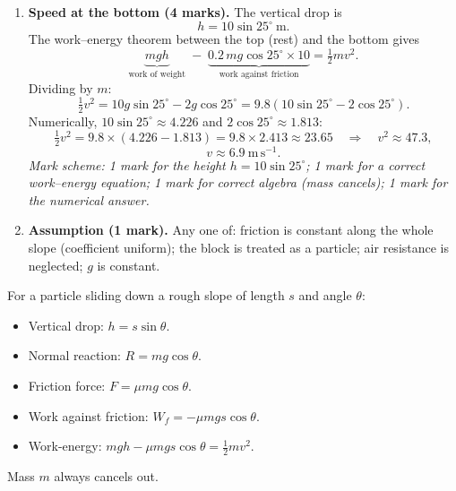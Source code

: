 \documentclass[11pt]{article}
\begin{document}
\begin{corrige}
\begin{enumerate}
\item \textbf{Speed at the bottom (4 marks).} The vertical drop is
\[
h = 10\sin 25^{\circ}\ \mathrm{m}.
\]
The work--energy theorem between the top (rest) and the bottom gives
\[
\underbrace{mgh}_{\text{work of weight}} \;-\; \underbrace{0.2\,mg\cos 25^{\circ}\times 10}_{\text{work against friction}} = \tfrac{1}{2}mv^{2}.
\]
Dividing by $m$:
\[
\tfrac{1}{2}v^{2} = 10g\sin 25^{\circ} - 2g\cos 25^{\circ} = 9.8\left(10\sin 25^{\circ} - 2\cos 25^{\circ}\right).
\]
Numerically, $10\sin 25^{\circ} \approx 4.226$ and $2\cos 25^{\circ} \approx 1.813$:
\[
\tfrac{1}{2}v^{2} = 9.8\times(4.226 - 1.813) = 9.8\times 2.413 \approx 23.65
\quad\Longrightarrow\quad
v^{2} \approx 47.3,
\]
\[
\boxed{v \approx 6.9\ \mathrm{m\,s^{-1}}.}
\]
\textit{Mark scheme: 1 mark for the height $h = 10\sin 25^{\circ}$; 1 mark for a correct work--energy equation; 1 mark for correct algebra (mass cancels); 1 mark for the numerical answer.}

\item \textbf{Assumption (1 mark).} Any one of: friction is constant along the whole slope (coefficient uniform); the block is treated as a particle; air resistance is neglected; $g$ is constant.
\end{enumerate}

\begin{aretenir}
For a particle sliding down a rough slope of length $s$ and angle $\theta$:
\begin{itemize}
\item Vertical drop: $h = s\sin\theta$.
\item Normal reaction: $R = mg\cos\theta$.
\item Friction force: $F = \mu mg\cos\theta$.
\item Work against friction: $W_f = -\mu mg s\cos\theta$.
\item Work-energy: $mgh - \mu mg s\cos\theta = \frac{1}{2}mv^2$.
\end{itemize}
Mass $m$ always cancels out.
\end{aretenir}
\end{corrige}
\end{document}
